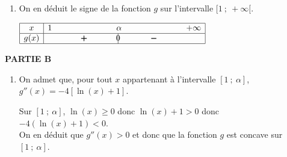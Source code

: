 \begin{enumerate}
\item On en déduit le signe de la fonction $g$ sur l'intervalle $[1~;~+\infty[$.

\begin{center}
\renewcommand{\arraystretch}{1.3}
\def\esp{\hspace*{2cm}}
$\begin{array}{|c | *{5}{c} |} 
\hline
x  & 1 & \esp & \alpha & \esp  & +\infty \\
\hline
g(x) &  & \pmb{+} &  \vline\hspace{-2.7pt}{0} & \pmb{-} &    \\
\hline
\end{array}$
\renewcommand{\arraystretch}{1}
\end{center}

\end{enumerate}

\medskip

\textbf{PARTIE B}

\medskip

\begin{enumerate}
\item On admet que, pour tout $x$ appartenant à l'intervalle $[1~;~\alpha]$, $g''(x) = - 4[\ln (x) + 1]$.



Sur $[1~;~\alpha]$, $\ln(x)\geqslant 0$ donc $\ln(x)+1>0$ donc $-4\left (\ln(x)+1\right )<0$. \\
On en déduit que $g''(x)>0$ et donc que la fonction $g$ est concave sur $[1~;~\alpha]$.
\end{enumerate}


